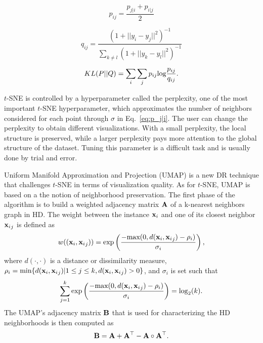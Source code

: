 \begin{equation}
    p_{ij} = \frac{p_{j|i}+p_{i|j}}{2}
\end{equation}

\begin{equation}\label{eq:q_ij}
    q_{ij} = \frac{(1+||y_i - y_j||^2)^{-1}}{\sum_{k\not=l}(1+||y_k - y_l||^2)^{-1}}
\end{equation}

\begin{equation}\label{eq:KL}
    KL(P||Q) = \sum_{i}\sum_{j} p_{ij} \textnormal{log}\frac{p_{ij}}{q_{ij}}.
\end{equation}

$t$-SNE is controlled by a hyperparameter called the perplexity, one of the most important  $t$-SNE hyperparameter, which approximates the number of neighbors considered for each point through $\sigma$ in Eq.~\ref{eq:p_j|i}. The user can change the perplexity to obtain different visualizations. With a small perplexity, the local structure is preserved, while a larger perplexity pays more attention to the global structure of the dataset. Tuning this parameter is a difficult task and is usually done by trial and error.

Uniform Manifold Approximation and Projection (UMAP) \cite{mcinnes2018umap} is a new DR technique that challenges $t$-SNE in terms of visualization quality. As for $t$-SNE, UMAP is based on a the notion of neighborhood preservation. The first phase of the algorithm is to build a weighted adjacency matrix ${\bf A}$ of a k-nearest neighbors graph in HD. The weight between the instance ${\bf x}_i$ and one of its closest neighbor ${{\bf x}_i}_j$ is defined as
\begin{equation}
    w(({\bf x}_i, {{\bf x}_i}_j)) = \textnormal{exp} \left( \frac{-\textnormal{max}(0, d({\bf x}_i, {{\bf x}_i}_j) - \rho_i)}{\sigma_i} \right),
\end{equation}
where $d(\cdot, \cdot)$ is a distance or dissimilarity measure, $\rho_i = \textnormal{min}\{d({\bf x}_i, {{\bf x}_i}_j) | 1 \leq j \leq k, d({\bf x}_i, {{\bf x}_i}_j) > 0\}$, and $\sigma_i$ is set such that
\begin{equation}
    \sum _{j=1}^k \textnormal{exp} \left( \frac{-\textnormal{max}(0, d({\bf x}_i, {{\bf x}_i}_j) - \rho_i)}{\sigma_i} \right) = \textnormal{log}_2(k).
\end{equation}
The UMAP's adjacency matrix ${\bf B}$ that is used for characterizing the HD neighborhoods is then computed as
\begin{equation}
    {\bf B} = {\bf A} + {\bf A}^\top - {\bf A} \circ {\bf A}^\top.
\end{equation}

